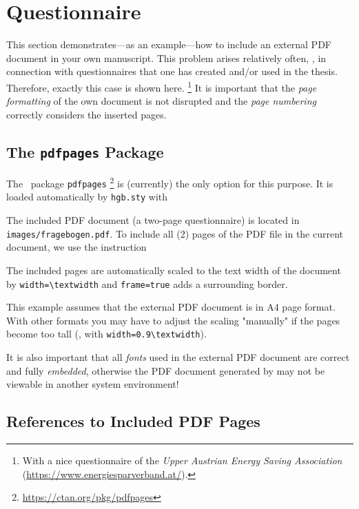 \chapter{Questionnaire}
\label{app:Questionnaire}

This section demonstrates---as an example---how to include an external PDF
document in your own \latex manuscript. This problem arises relatively often, 
\eg, in connection with questionnaires that one has created and/or used in
the thesis. Therefore, exactly this case is shown here.%
\footnote{With a nice questionnaire of the \emph{Upper Austrian Energy Saving
Association} (\url{https://www.energiesparverband.at/}).} 
It is important that the \emph{page formatting} of the own document is not
disrupted and the \emph{page numbering} correctly considers the inserted
pages.


\section{The \texttt{pdfpages} Package}

The \latex\ package \texttt{pdfpages}%
\footnote{\url{https://ctan.org/pkg/pdfpages}}
is (currently) the only option for this purpose. It is loaded automatically
by \nolinkurl{hgb.sty} with
%
\begin{LaTeXCode}[numbers=none]
\RequirePackage{pdfpages}
\end{LaTeXCode}
%
The included PDF document (a two-page questionnaire) is located in
\nolinkurl{images/fragebogen.pdf}. To include all (2) pages of the PDF file
in the current document, we use the instruction
%
\begin{LaTeXCode}[numbers=none]

\end{LaTeXCode}
%
The included pages are automatically scaled to the text width of the \latex document
by \verb!width=\textwidth! and \verb!frame=true! adds a surrounding border.

This example assumes that the external PDF document is in A4 page format.
With other formats you may have to adjust the scaling "manually" if the pages become
too tall (\eg, with \verb!width=0.9\textwidth!).

It is also important that all \emph{fonts} used in the external PDF document are
correct and fully \emph{embedded}, otherwise the PDF document generated by \latex may
not be viewable in another system environment!


\section{References to Included PDF Pages}

